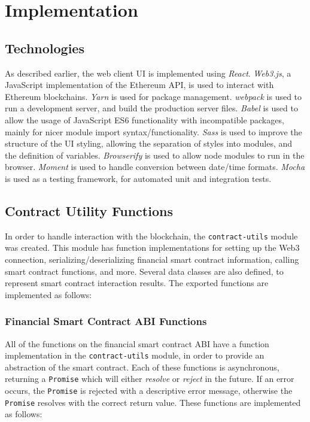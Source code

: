 \section{Implementation}

\subsection{Technologies}

As described earlier, the web client UI is implemented using \textit{React}\cite{react}. \textit{Web3.js}\cite{web3-intro}, a JavaScript implementation of the Ethereum API, is used to interact with Ethereum blockchains. \textit{Yarn} is used for package management. \textit{webpack}\cite{webpack} is used to run a development server, and build the production server files. \textit{Babel}\cite{babel} is used to allow the usage of JavaScript ES6 functionality with incompatible packages, mainly for nicer module import syntax/functionality. \textit{Sass}\cite{sass} is used to improve the structure of the UI styling, allowing the separation of styles into modules, and the definition of variables. \textit{Browserify}\cite{browserify} is used to allow node modules to run in the browser. \textit{Moment}\cite{moment} is used to handle conversion between date/time formats. \textit{Mocha}\cite{mocha} is used as a testing framework, for automated unit and integration tests.


\subsection{Contract Utility Functions}

In order to handle interaction with the blockchain, the \texttt{contract-utils} module was created. This module has function implementations for setting up the Web3 connection, serializing/deserializing financial smart contract information, calling smart contract functions, and more. Several data classes are also defined, to represent smart contract interaction results. The exported functions are implemented as follows: \\


\subsubsection{Financial Smart Contract ABI Functions}

All of the functions on the financial smart contract ABI have a function implementation in the \texttt{contract-utils} module, in order to provide an abstraction of the smart contract. Each of these functions is asynchronous, returning a \texttt{Promise} which will either \textit{resolve} or \textit{reject} in the future. If an error occurs, the \texttt{Promise} is rejected with a descriptive error message, otherwise the \texttt{Promise} resolves with the correct return value. These functions are implemented as follows:


